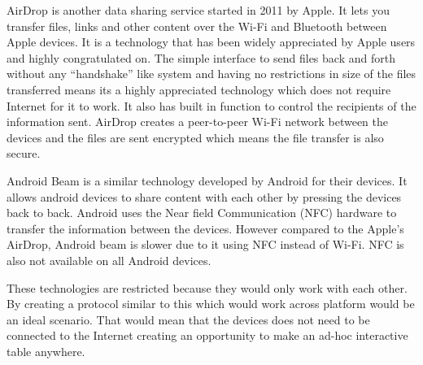 AirDrop\cite{airdrop} is another data sharing service started in
2011 by Apple. It lets you transfer files, links and other content
over the Wi-Fi and Bluetooth between Apple devices. It is a technology
that has been widely appreciated by Apple users and highly congratulated
on. The simple interface to send files back and forth without any
``handshake'' like system and having no restrictions in size of
the files transferred means its a highly appreciated technology which
does not require Internet for it to work. It also has built in function
to control the recipients of the information sent. AirDrop creates
a peer-to-peer Wi-Fi network between the devices and the files are
sent encrypted which means the file transfer is also secure.
 
Android Beam\cite{android-beam} is a similar technology developed
by Android for their devices. It allows android devices to share content
with each other by pressing the devices back to back. Android uses
the Near field Communication (NFC) hardware to transfer the information
between the devices. However compared to the Apple's AirDrop, Android
beam is slower due to it using NFC instead of Wi-Fi. NFC is also not
available on all Android devices.
 
These technologies are restricted because they would only work with
each other. By creating a protocol similar to this which would work
across platform would be an ideal scenario. That would mean that the
devices does not need to be connected to the Internet creating an
opportunity to make an ad-hoc interactive table anywhere.
 

